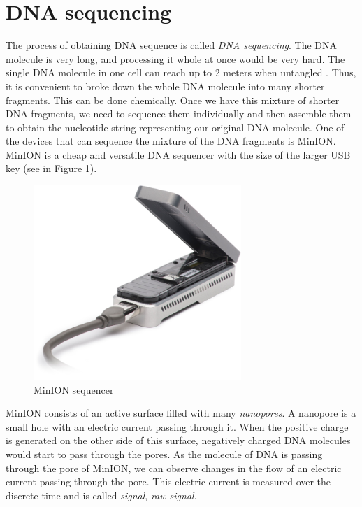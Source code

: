 \section{DNA sequencing}
\label{section:dnaSequencing}

The process of obtaining DNA sequence is called \textit{DNA sequencing}.
The DNA molecule is very long, and processing it whole at once would be very hard.
The single DNA molecule in one cell can reach up to 2 meters when untangled \cite{dnaLength:2020}.
Thus, it is convenient to broke down the whole DNA molecule into many shorter fragments.
This can be done chemically. Once we have this mixture of shorter DNA fragments, we need to sequence them
individually and then assemble them to obtain the nucleotide string representing
our original DNA molecule. One of the devices that can sequence the mixture of the
DNA fragments is MinION\cite{lu2016oxford}. MinION is a cheap and versatile DNA sequencer
with the size of the larger USB key (see in Figure \ref{obr:minIon}).

\begin{figure}
\centerline{\includegraphics[width=0.7\textwidth, height=0.3\textheight]{images/minion}}
\caption[MinION]{MinION sequencer\cite{MinION:2020}}
\label{obr:minIon}
\end{figure}

MinION consists of an active surface filled with many \textit{nanopores}. A nanopore
is a small hole with an electric current passing through it. When the positive charge
is generated on the other side of this surface, negatively charged DNA molecules
would start to pass through the pores. As the molecule of DNA is passing through the pore of
MinION, we can observe changes in the flow of an electric current passing through the pore.
This electric current is measured over the discrete-time and is called \textit{signal},
\textit{raw signal}.

